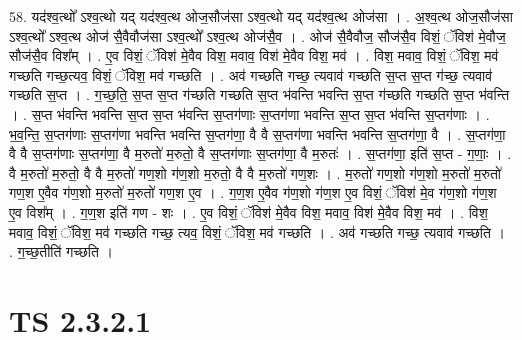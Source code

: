\documentclass[17pt]{extarticle}
\begin{document}
58. यद॑श्व॒त्थो᳚ ऽश्व॒त्थो यद् यद॑श्व॒त्थ ओज॒सौज॑सा ऽश्व॒त्थो यद् यद॑श्व॒त्थ ओज॑सा । . अ॒श्व॒त्थ ओज॒सौज॑सा ऽश्व॒त्थो᳚ ऽश्व॒त्थ ओज॑ सै॒वैवौज॑सा ऽश्व॒त्थो᳚ ऽश्व॒त्थ ओज॑सै॒व । . ओज॑ सै॒वैवौज॒ सौज॑सै॒व विशं॒ ॅविश॑ मे॒वौज॒ सौज॑सै॒व विश᳚म् । . ए॒व विशं॒ ॅविश॑ मे॒वैव विश॒ मवाव॒ विश॑ मे॒वैव विश॒ मव॑ । . विश॒ मवाव॒ विशं॒ ॅविश॒ मव॑ गच्छति गच्छ॒त्यव॒ विशं॒ ॅविश॒ मव॑ गच्छति । . अव॑ गच्छति गच्छ॒ त्यवाव॑ गच्छति स॒प्त स॒प्त ग॑च्छ॒ त्यवाव॑ गच्छति स॒प्त । . ग॒च्छ॒ति॒ स॒प्त स॒प्त ग॑च्छति गच्छति स॒प्त भ॑वन्ति भवन्ति स॒प्त ग॑च्छति गच्छति स॒प्त भ॑वन्ति । . स॒प्त भ॑वन्ति भवन्ति स॒प्त स॒प्त भ॑वन्ति स॒प्तग॑णाः स॒प्तग॑णा भवन्ति स॒प्त स॒प्त भ॑वन्ति स॒प्तग॑णाः । . भ॒व॒न्ति॒ स॒प्तग॑णाः स॒प्तग॑णा भवन्ति भवन्ति स॒प्तग॑णा॒ वै वै स॒प्तग॑णा भवन्ति भवन्ति स॒प्तग॑णा॒ वै । . स॒प्तग॑णा॒ वै वै स॒प्तग॑णाः स॒प्तग॑णा॒ वै म॒रुतो॑ म॒रुतो॒ वै स॒प्तग॑णाः स॒प्तग॑णा॒ वै म॒रुतः॑ । . स॒प्तग॑णा॒ इति॑ स॒प्त - ग॒णाः॒ । . वै म॒रुतो॑ म॒रुतो॒ वै वै म॒रुतो॑ गण॒शो ग॑ण॒शो म॒रुतो॒ वै वै म॒रुतो॑ गण॒शः । . म॒रुतो॑ गण॒शो ग॑ण॒शो म॒रुतो॑ म॒रुतो॑ गण॒श ए॒वैव ग॑ण॒शो म॒रुतो॑ म॒रुतो॑ गण॒श ए॒व । . ग॒ण॒श ए॒वैव ग॑ण॒शो ग॑ण॒श ए॒व विशं॒ ॅविश॑ मे॒व ग॑ण॒शो ग॑ण॒श ए॒व विश᳚म् । . ग॒ण॒श इति॑ गण - शः । . ए॒व विशं॒ ॅविश॑ मे॒वैव विश॒ मवाव॒ विश॑ मे॒वैव विश॒ मव॑ । . विश॒ मवाव॒ विशं॒ ॅविश॒ मव॑ गच्छति गच्छ॒ त्यव॒ विशं॒ ॅविश॒ मव॑ गच्छति । . अव॑ गच्छति गच्छ॒ त्यवाव॑ गच्छति । . ग॒च्छ॒तीति॑ गच्छति । \newline
\pagebreak
{}
\section*{ TS 2.3.2.1 }
\end{document}

